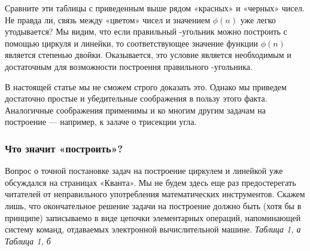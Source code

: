 \begin{multicols}{3}
Сравните эти таблицы с приведенным выше рядом «красных» и «черных» чисел. Не правда ли, связь между «цветом» чисел \n и значением
$\phi(n)$ уже легко утодывается? Мы
видим, что если правильный \n-угольник можно построить с помощью
циркуля и линейки, то соответствующее значение функции $\phi(n)$ является
степенью двойки. Оказывается, это
условие является необходимым и
достаточным для возможности построення правильного \n-угольника.

В настоящей статье мы не сможем
строго доказать это. Однако мы приведем достаточно простые и убедительные соображения в пользу этого
факта. Аналогичные соображения
применимы и ко многим другим задачам на построение — например, к
залаче о трисекции угла.

\subsubsection{Что значит «построить»?}

Вопрос о точной постановке задач на
построение циркулем и линейкой уже
обсуждался на страницах «Кванта».
Мы не будем здесь еще раз предостерегать читателей от неправильного
употребления математических инструментов. Скажем лишь, что окончательное решение задачи на построение должно быть (хотя бы в принципе)
записываемо в виде цепочки элементарных операций, напоминающей систему команд, отдаваемых электронной вычислительной машине.
\flushright
\textit{Таблица 1, а}
\vspace{1.2cm}\\
\textit{Таблица 1, б}
\newpage
\end{multicols}